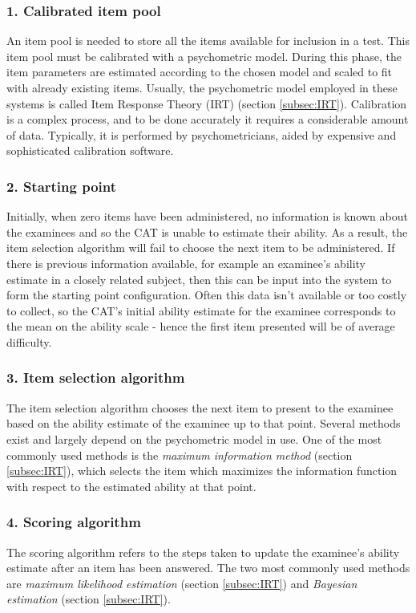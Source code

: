 \subsubsection{1. Calibrated item pool}
An item pool is needed to store all the items available for inclusion in a test. This item pool must be calibrated with a psychometric model. During this phase, the item parameters are estimated according to the chosen model and scaled to fit with already existing items. Usually, the psychometric model employed in these systems is called Item Response Theory (IRT) (section \ref{subsec:IRT}). Calibration is a complex process, and to be done accurately it requires a considerable amount of data. Typically, it is performed by psychometricians, aided by expensive and sophisticated calibration software.

\subsubsection{2. Starting point}
Initially, when zero items have been administered, no information is known about the examinees and so the CAT is unable to estimate their ability. As a result, the item selection algorithm will fail to choose the next item to be administered.
If there is previous information available, for example an examinee's ability estimate in a closely related subject, then this can be input into the system to form the starting point configuration. Often this data isn't available or too costly to collect, so the CAT's initial ability estimate for the examinee corresponds to the mean on the ability scale - hence the first item presented will be of average difficulty.

\subsubsection{3. Item selection algorithm}
The item selection algorithm chooses the next item to present to the examinee based on the ability estimate of the examinee up to that point. Several methods exist and largely depend on the psychometric model in use. One of the most commonly used methods is the \textit{maximum information method} (section \ref{subsec:IRT}), which selects the item which maximizes the information function with respect to the estimated ability at that point.

\subsubsection{4. Scoring algorithm}
The scoring algorithm refers to the steps taken to update the examinee's ability estimate after an item has been answered. The two most commonly used methods are \textit{maximum likelihood estimation} (section \ref{subsec:IRT}) and \textit{Bayesian estimation} (section \ref{subsec:IRT}).

